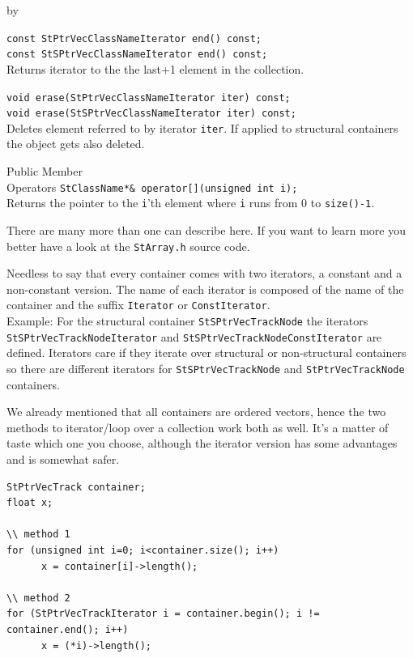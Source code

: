\documentclass[twoside]{article}
\newcommand{\entrylabel}[1]{\mbox{\textbf{{#1}}}\hfil}%
\newenvironment{entry}
{\begin{list}{}%
    {\renewcommand{\makelabel}{\entrylabel}%
     \setlength{\labelwidth}{90pt}%
     \setlength{\leftmargin}{\labelwidth}
     \advance\leftmargin by \labelsep%
      }%
    }%
  {\end{list}}
\newcommand{\Entrylabel}[1]%
{\raisebox{0pt}[1ex][0pt]{\makebox[\labelwidth][l]%
    {\parbox[t]{\labelwidth}{\hspace{0pt}\textbf{{#1}}}}}}
\newenvironment{Entry}%
{\renewcommand{\entrylabel}{\Entrylabel}\begin{entry}}%
  {\end{entry}}
\begin{document}
\begin{Entry}
    \verb+const StPtrVecClassNameIterator end() const;+\\
    \verb+const StSPtrVecClassNameIterator end() const;+\\
    Returns iterator to the the last+1 element in the collection.
    
    \verb+void erase(StPtrVecClassNameIterator iter) const;+\\
    \verb+void erase(StSPtrVecClassNameIterator iter) const;+\\
    Deletes element referred to by iterator \texttt{iter}.  If applied
    to structural containers the object gets also deleted.
    
\item[Public Member\\ Operators]
    \verb+StClassName*& operator[](unsigned int i);+\\
    Returns the pointer to the \texttt{i}'th element where \texttt{i}
    runs from 0 to \texttt{size()-1}.
\end{Entry}
There are many more than one can describe here.  If you want to learn
more you better have a look at the \texttt{StArray.h} source code.

Needless to say that every container comes with two iterators, a
constant and a non-constant version.  The name of each iterator is
composed of the name of the container and the
suffix \texttt{Iterator} or \texttt{ConstIterator}.\\
Example: For the structural container \texttt{StSPtrVecTrackNode} the
iterators \texttt{StSPtrVecTrackNodeIterator} and
\texttt{StSPtrVecTrackNodeConstIterator} are defined. Iterators care
if they iterate over structural or non-structural containers so there
are different iterators for \texttt{StSPtrVecTrackNode} and
\texttt{StPtrVecTrackNode} containers.

We already mentioned that all containers are ordered vectors, hence
the two methods to iterator/loop over a collection work both as well.
It's a matter of taste which one you choose, although the iterator
version has some advantages and is somewhat safer.

\begin{verbatim}
StPtrVecTrack container;
float x;

\\ method 1
for (unsigned int i=0; i<container.size(); i++)
      x = container[i]->length();

\\ method 2
for (StPtrVecTrackIterator i = container.begin(); i != container.end(); i++)
      x = (*i)->length();
\end{verbatim}
\end{document}
